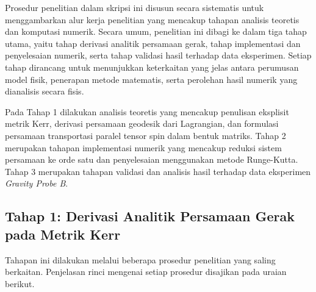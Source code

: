 Prosedur penelitian dalam skripsi ini disusun secara sistematis untuk menggambarkan alur kerja penelitian yang mencakup tahapan analisis teoretis dan komputasi numerik. Secara umum, penelitian ini dibagi ke dalam tiga tahap utama, yaitu tahap derivasi analitik persamaan gerak, tahap implementasi dan penyelesaian numerik, serta tahap validasi hasil terhadap data eksperimen. Setiap tahap dirancang untuk menunjukkan keterkaitan yang jelas antara perumusan model fisik, penerapan metode matematis, serta perolehan hasil numerik yang dianalisis secara fisis.

Pada Tahap 1 dilakukan analisis teoretis yang mencakup penulisan eksplisit metrik Kerr, derivasi persamaan geodesik dari Lagrangian, dan formulasi persamaan transportasi paralel tensor spin dalam bentuk matriks. Tahap 2 merupakan tahapan implementasi numerik yang mencakup reduksi sistem persamaan ke orde satu dan penyelesaian menggunakan metode Runge-Kutta. Tahap 3 merupakan tahapan validasi dan analisis hasil terhadap data eksperimen \textit{Gravity Probe B}.

\subsection{Tahap 1: Derivasi Analitik Persamaan Gerak pada Metrik Kerr}
\label{subsec:tahap1}

Tahapan ini dilakukan melalui beberapa prosedur penelitian yang saling berkaitan. Penjelasan rinci mengenai setiap prosedur disajikan pada uraian berikut.

